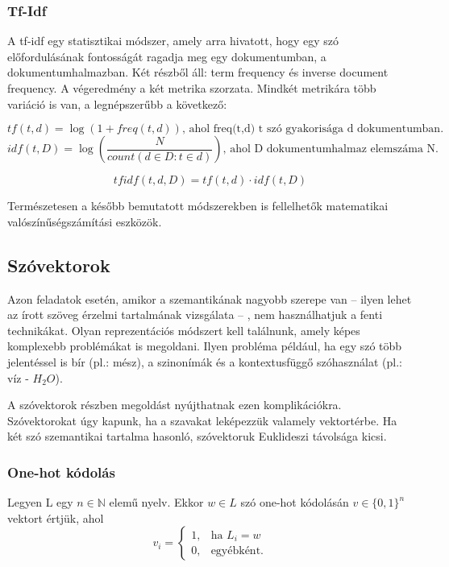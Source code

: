 \subsubsection{Tf-Idf}

A tf-idf egy statisztikai módszer, amely arra hivatott, hogy egy szó előfordulásának fontosságát ragadja meg egy dokumentumban, a dokumentumhalmazban. Két részből áll: term frequency és inverse document frequency. A végeredmény a két metrika szorzata. Mindkét metrikára több variáció is van, a legnépszerűbb a következő:

\begin{definition}
$$tf\left(t,d\right) = \log \left( 1 + freq\left(t,d\right)\right) \text{, ahol freq(t,d) t szó gyakorisága d dokumentumban.}$$
$$idf\left(t,D\right) = \log \left( \frac{N}{count \left( d \in D:t \in d \right) } \right) \text{, ahol D dokumentumhalmaz elemszáma N.}$$

$$tfidf(t,d,D) = tf(t,d) \cdot idf(t,D)$$

\end{definition}

\begin{note}
	Természetesen a később bemutatott módszerekben is fellelhetők matematikai valószínűségszámítási eszközök.
\end{note}

\subsection{Szóvektorok}

Azon feladatok esetén, amikor a szemantikának nagyobb szerepe van – ilyen lehet az írott szöveg érzelmi tartalmának vizsgálata – , nem használhatjuk a fenti technikákat. Olyan reprezentációs módszert kell találnunk, amely képes komplexebb problémákat is megoldani. Ilyen probléma például, ha egy szó több jelentéssel is bír (pl.: mész), a szinonímák és a kontextusfüggő szóhasználat (pl.: víz - $H_2O$).

A szóvektorok részben megoldást nyújthatnak ezen komplikációkra. Szóvektorokat úgy kapunk, ha a szavakat leképezzük valamely vektortérbe. Ha két szó szemantikai tartalma hasonló, szóvektoruk Euklideszi távolsága kicsi.

\subsubsection{One-hot kódolás}

\begin{definition}
Legyen L egy $n \in \mathbb{N}$ elemű nyelv. Ekkor $w \in L$ szó one-hot kódolásán $v \in \{0,1\}^n$ vektort értjük, ahol 
\[
v_i= 
\begin{cases}
1,				& \text{ha } L_i = w\\
0,              & \text{egyébként.}
\end{cases}
\]
\end{definition}

